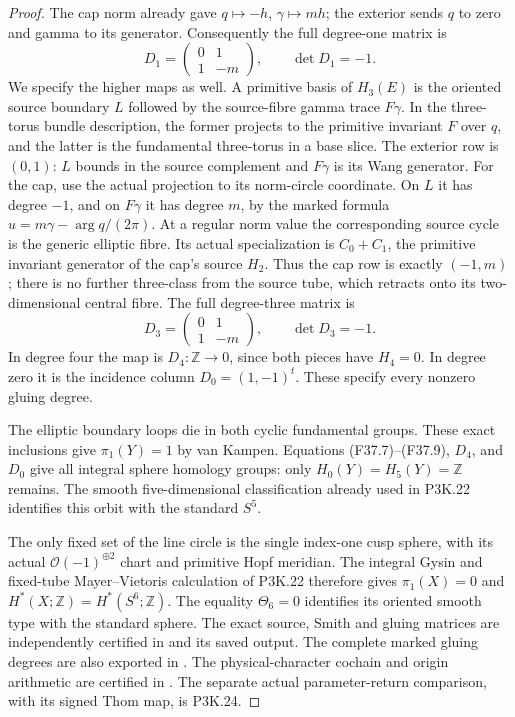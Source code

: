 \begin{proof}
The cap norm already gave $q\mapsto-h$, $\gamma\mapsto mh$;
the exterior sends $q$ to zero and gamma to its generator.
Consequently the full degree-one matrix is
\[
              D_1=\begin{pmatrix}0&1\\1&-m\end{pmatrix},
              \qquad\det D_1=-1.                     \tag{F37.8}
\]
We specify the higher maps as well. A primitive basis of $H_3(E)$
is the oriented source boundary $L$ followed by the source-fibre
gamma trace $F\gamma$. In the three-torus bundle description,
the former projects to the primitive invariant $F$ over $q$,
and the latter is the fundamental three-torus in a base slice.
The exterior row is $(0,1)$: $L$ bounds in the source complement
and $F\gamma$ is its Wang generator. For the cap, use the actual
projection to its norm-circle coordinate. On $L$ it has degree
$-1$, and on $F\gamma$ it has degree $m$, by the marked formula
$u=m\gamma-\arg q/(2\pi)$. At a regular norm value the corresponding
source cycle is the generic elliptic fibre. Its actual specialization
is $C_0+C_1$, the primitive invariant generator of the cap's source
$H_2$. Thus the cap row is exactly $(-1,m)$; there is no further
three-class from the source tube, which retracts onto its
two-dimensional central fibre. The full degree-three matrix is
\[
 D_3=\begin{pmatrix}0&1\\1&-m\end{pmatrix},
 \qquad \det D_3=-1.                                  \tag{F37.9}
\]
In degree four the map is $D_4:\mathbb Z\to0$, since both
pieces have $H_4=0$. In degree zero it is the incidence column
$D_0=(1,-1)^t$. These specify every nonzero gluing degree.

The elliptic boundary loops die in both cyclic fundamental groups.
These exact inclusions give $\pi_1(Y)=1$ by van Kampen.
Equations (F37.7)--(F37.9), $D_4$, and $D_0$ give all integral
sphere homology groups: only $H_0(Y)=H_5(Y)=\mathbb Z$ remains.
The smooth five-dimensional classification already used in
P3K.22 identifies this orbit with the standard $S^5$.

The only fixed set of the line circle is the single index-one
cusp sphere, with its actual $\mathcal O(-1)^{\oplus2}$ chart
and primitive Hopf meridian. The integral Gysin and fixed-tube
Mayer--Vietoris calculation of P3K.22 therefore gives
$\pi_1(X)=0$ and $H^*(X;\mathbb Z)=H^*(S^6;\mathbb Z)$.
The equality $\Theta_6=0$ identifies its oriented smooth type
with the standard sphere. The exact source, Smith and gluing
matrices are independently certified in
 and its saved output.
The complete marked gluing degrees are also exported in
. The physical-character
cochain and origin arithmetic are certified in
. The separate actual
parameter-return comparison, with its signed Thom map, is P3K.24.
\end{proof}

